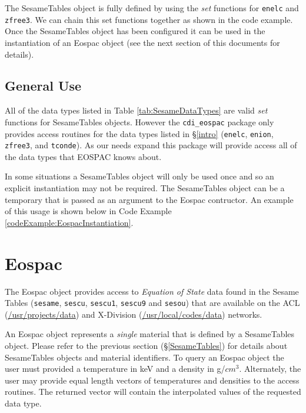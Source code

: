 \documentclass[11pt]{nmemo}
\begin{document}
The SesameTables object is fully defined by using the \emph{set}
functions for \texttt{enelc} and \texttt{zfree3}.  We can chain this
set functions together as shown in the code example.  Once the
SesameTables object has been configured it can be used in the
instantiation of an Eospac object (see the next section of this
documents for details).


\subsection{General Use}

All of the data types listed in Table \ref{tab:SesameDataTypes} are
valid \emph{set} functions for SesameTables objects.  However the
\texttt{cdi\_eospac} package only provides access routines for the data 
types listed in \S\ref{intro} (\texttt{enelc}, \texttt{enion},
\texttt{zfree3}, and \texttt{tconde}).  As our needs expand this
package will provide access all of the data types that EOSPAC knows
about. 

In some situations a SesameTables object will only be used once and so 
an explicit instantiation may not be required.  The SesameTables
object can be a temporary that is passed as an argument to the Eospac
contructor.  An example of this usage is shown below in Code Example
\ref{codeExample:EospacInstantiation}. 




\section{Eospac}

The Eospac object provides access to \emph{Equation of State} data
found in the Sesame Tables (\texttt{sesame}, \texttt{sescu},
\texttt{sescu1}, \texttt{sescu9} and \texttt{sesou}) that are
available on the ACL (\url{/usr/projects/data}) and X-Division
(\url{/usr/local/codes/data}) networks.  

An Eospac object represents a \emph{single} material that is defined
by a SesameTables object.  Please refer to the previous section
(\S\ref{SesameTables}) for details about SesameTables objects and
material identifiers.  To query an Eospac object the user must
provided a temperature in keV and a density in g/$cm^3$.  Alternately,
the user may provide equal length vectors of temperatures and
densities to the access routines.  The returned vector will contain
the interpolated values of the requested data type.
\end{document}
